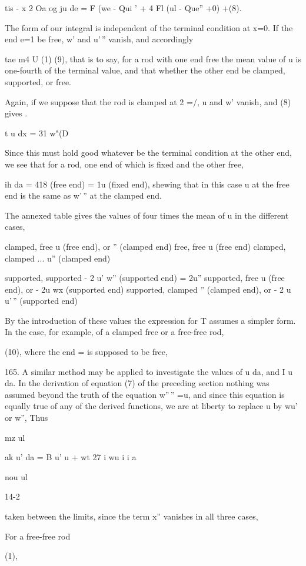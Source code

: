 tis - x 2 Oa og ju de = F (we - Qui ' + 4 Fl (ul - Que'' +0) +(8).

The form of our integral is independent of the terminal condition at
x=0. If the end e=1 be free, w' and u'\,'' vanish, and accordingly

tae m4 U (1) (9),
that is to say, for a rod with one end free the mean value of u is
one-fourth of the terminal value, and that whether the other end be
clamped, supported, or free.


Again, if we suppose that the rod is clamped at 2 =/, u and w' vanish,
and (8) gives .

t u dx = 31 w"(D

Since this must hold good whatever be the terminal condition at
the other end, we see that for a rod, one end of which is fixed and the
other free,

ih da = 418 (free end) = 1u (fixed end),
shewing that in this case u at the free end is the same as w'\,'' at the
clamped end.

The annexed table gives the values of four times the mean of u in the
different cases,

clamped, free u (free end), or '' (clamped end) free, free u (free end)
clamped, clamped ... u'' (clamped end)

supported, supported - 2 u' w'' (supported end) = 2u'' supported, free u
(free end), or - 2u wx (supported end) supported, clamped '' (clamped
end), or - 2 u u'\,'' (supported end)

By the introduction of these values the expression for T assumes a
simpler form. In the case, for example, of a clamped free or a free-free
rod,

(10), where the end = is supposed to be free,

165. A similar method may be applied to investigate the values of u da,
and I u da. In the derivation of equation (7) of the
preceding section nothing was assumed beyond the truth of the equation
w''\,'' =u, and since this equation is equally true of any of the
derived functions, we are at liberty to replace u by wu' or w'', Thus

mz ul

ak u' da = B u' u + wt 27 i wu i i a

nou ul

14-2

taken between the limits, since the term x'' vanishes in all three
cases,

For a free-free rod

(1),

